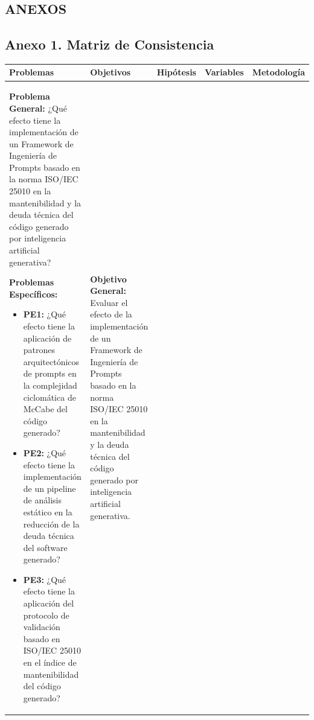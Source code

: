 \begin{landscape}
\thispagestyle{empty}

\section*{ANEXOS}

\subsection*{Anexo 1. Matriz de Consistencia}

\noindent

\small
\setlength{\tabcolsep}{4pt}
\renewcommand{\arraystretch}{0.9}

\begin{adjustbox}{max width=\linewidth, max height=0.95\textheight, keepaspectratio}
\begin{tabularx}{\linewidth}{|Y|Y|Y|Y|Y|}
\hline
{} 
\textbf{Problemas} & \textbf{Objetivos} & \textbf{Hipótesis} & \textbf{Variables} & \textbf{Metodología} \\ \hline

\textbf{Problema General:} \newline
¿Qué efecto tiene la implementación de un Framework de Ingeniería de Prompts basado en la norma ISO/IEC 25010 en la mantenibilidad y la deuda técnica del código generado por inteligencia artificial generativa? \newline

\textbf{Problemas Específicos:}
\begin{itemize}[leftmargin=*, nosep, itemsep=6pt]
    \item \textbf{PE1:} ¿Qué efecto tiene la aplicación de patrones arquitectónicos de prompts en la complejidad ciclomática de McCabe del código generado?
    \item \textbf{PE2:} ¿Qué efecto tiene la implementación de un pipeline de análisis estático en la reducción de la deuda técnica del software generado?
    \item \textbf{PE3:} ¿Qué efecto tiene la aplicación del protocolo de validación basado en ISO/IEC 25010 en el índice de mantenibilidad del código generado?
\end{itemize}
&
\textbf{Objetivo General:} \newline
Evaluar el efecto de la implementación de un Framework de Ingeniería de Prompts basado en la norma ISO/IEC 25010 en la mantenibilidad y la deuda técnica del código generado por inteligencia artificial generativa. \newline


\end{tabularx}
\end{adjustbox}
\end{landscape}
